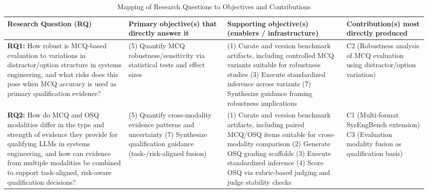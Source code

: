
\begin{table}[htbp]
\centering
\caption{Mapping of Research Questions to Objectives and Contributions}
\label{tab:rq_obj_contrib_mapping}

\small
\setlength{\tabcolsep}{4pt}
\renewcommand{\arraystretch}{1.15}

\begin{tabularx}{\linewidth}{p{3.2cm} Y Y p{3.3cm}}
\toprule
\textbf{Research Question (RQ)} &
\textbf{Primary objective(s) that directly answer it} &
\textbf{Supporting objective(s) (enablers / infrastructure)} &
\textbf{Contribution(s) most directly produced} \\
\midrule

\textbf{RQ1:} How robust is MCQ-based evaluation to variations in distractor/option structure in systems engineering, and what risks does this pose when MCQ accuracy is used as primary qualification evidence? &
(5) Quantify MCQ robustness/sensitivity via statistical tests and effect sizes &
(1) Curate and version benchmark artifacts, including controlled MCQ variants suitable for robustness studies\newline
(3) Execute standardized inference across variants\newline
(7) Synthesize guidance framing robustness implications &
C2 (Robustness analysis of MCQ evaluation using distractor/option variation) \\
\midrule

\textbf{RQ2:} How do MCQ and OSQ modalities differ in the type and strength of evidence they provide for qualifying LLMs in systems engineering, and how can evidence from multiple modalities be combined to support task-aligned, risk-aware qualification decisions? &
(5) Quantify cross-modality evidence patterns and uncertainty\newline
(7) Synthesize qualification guidance (task-/risk-aligned fusion) &
(1) Curate and version benchmark artifacts, including paired MCQ/OSQ items suitable for cross-modality comparison\newline
(2) Generate OSQ grading scaffolds\newline
(3) Execute standardized inference\newline
(4) Score OSQ via rubric-based judging and judge stability checks &
C1 (Multi-format SysEngBench extension)\newline
C3 (Evaluation modality fusion as qualification basis) \\
\midrule


\end{tabularx}
\end{table}
